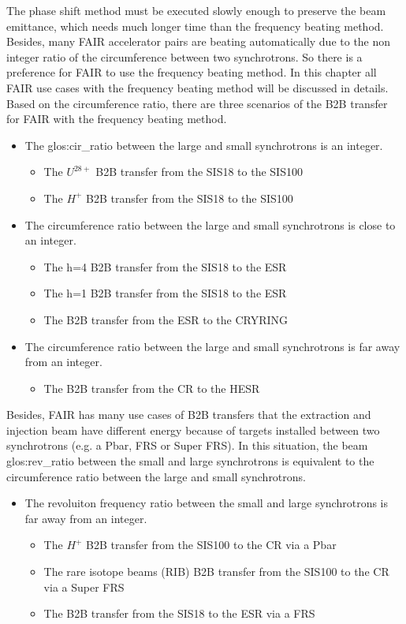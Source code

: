 The phase shift method must be executed slowly enough to preserve the beam emittance, which needs much longer time than the frequency beating method. Besides, many FAIR accelerator pairs are beating automatically due to the non integer ratio of the circumference between two synchrotrons. So there is a preference for FAIR to use the frequency beating method. In this chapter all FAIR use cases with the frequency beating method will be discussed in details. Based on the circumference ratio, there are three scenarios of the B2B transfer for FAIR with the frequency beating method. 
\begin{itemize}
	\item The \gls{glos:cir_ratio} between the large and small synchrotrons is an integer.
		\begin{itemize}
			\item	The $U^{28+}$ B2B transfer from the SIS18 to the SIS100
			\item The $H^{+}$ B2B transfer from the SIS18 to the SIS100

		\end{itemize}
	\item The circumference ratio between the large and small synchrotrons is close to an integer.
		\begin{itemize}
			\item The h=4 B2B transfer from the SIS18 to the ESR
			\item The h=1 B2B transfer from the SIS18 to the ESR
			\item The B2B transfer from the ESR to the CRYRING
		\end{itemize}
 	\item The circumference ratio between the large and small synchrotrons is far away from an integer.
		\begin{itemize}
			\item The B2B transfer from the CR to the HESR
		\end{itemize}
\end{itemize}
Besides, FAIR has many use cases of B2B transfers that the extraction and injection beam have different energy because of targets installed between two synchrotrons (e.g. a Pbar, FRS or Super FRS). In this situation, the beam \gls{glos:rev_ratio} between the small and large synchrotrons is equivalent to the circumference ratio between the large and small synchrotrons. 

\begin{itemize}

 	\item The revoluiton frequency ratio between the small and large synchrotrons is far away from an integer.
		\begin{itemize}
			\item The $H^{+}$ B2B transfer from the SIS100 to the CR via a Pbar
			\item The rare isotope beams (\gls{RIB}) B2B transfer from the SIS100 to the CR via a Super FRS
			\item The B2B transfer from the SIS18 to the ESR via a FRS
		\end{itemize}
\end{itemize}
  
